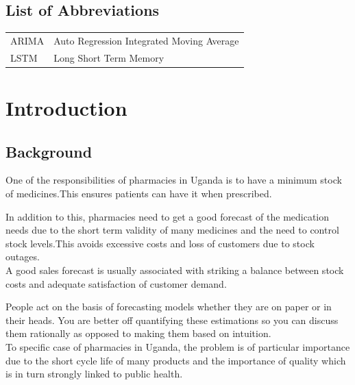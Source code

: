 \documentclass[12pt]{report}
\begin{document}
\newpage

\tableofcontents

\newpage

\listoffigures

\newpage

\listoftables

\newpage



\section*{List of Abbreviations}

\begin{tabular}{p{3cm} l}
	ARIMA	& Auto Regression Integrated Moving Average\\
	LSTM	& Long Short Term Memory\\	
	

\end{tabular}


\newpage

\chapter{Introduction}

\section{Background}
One of the responsibilities of pharmacies in  Uganda is to have a minimum stock of medicines.This ensures patients can have it when prescribed.

In addition to this, pharmacies need to get a good forecast of the medication needs due to the short term validity of many medicines and the need to control stock levels.This avoids excessive costs and loss of customers due to stock outages.\\

A good sales forecast is usually associated with striking a balance between stock costs and adequate satisfaction of customer demand.

People act on the basis of forecasting models whether they are on paper or in their heads. You are better off quantifying these estimations so you can discuss them rationally as opposed to making them based on intuition.\\

To specific case of pharmacies in Uganda, the problem is of particular importance due to the short cycle life of many products and the importance of quality which is in turn strongly linked to public health.
\end{document}
